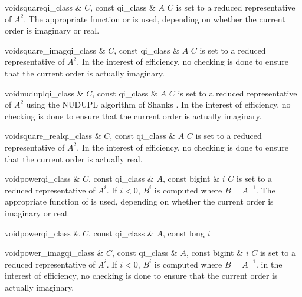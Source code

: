 \begin{fcode}{void}{square}{qi_class & $C$, const qi_class & $A$}
  $C$ is set to a reduced representative of $A^2$.  The appropriate function 
  or  is used, depending on whether the current order is imaginary or real.
\end{fcode}

\begin{fcode}{void}{square_imag}{qi_class & $C$, const qi_class & $A$}
  $C$ is set to a reduced representative of $A^2$.  In the interest of efficiency, no checking
  is done to ensure that the current order is actually imaginary.
\end{fcode}

\begin{fcode}{void}{nudupl}{qi_class & $C$, const qi_class & $A$}
  $C$ is set to a reduced representative of $A^2$ using the NUDUPL algorithm of Shanks
  \cite{Cohen:1995}.  In the interest of efficiency, no checking is done to ensure that the
  current order is actually imaginary.
\end{fcode}

\begin{fcode}{void}{square_real}{qi_class & $C$, const qi_class & $A$}
  $C$ is set to a reduced representative of $A^2$.  In the interest of efficiency, no checking
  is done to ensure that the current order is actually real.
\end{fcode}

\begin{fcode}{void}{power}{qi_class & $C$, const qi_class & $A$, const bigint & $i$}
  $C$ is set to a reduced representative of $A^i$.  If $i < 0$, $B^i$ is computed where $B =
  A^{-1}$.  The appropriate function  of  is used, depending
  on whether the current order is imaginary or real.
\end{fcode}

\begin{fcode}{void}{power}{qi_class & $C$, const qi_class & $A$, const long $i$}
\end{fcode}

\begin{fcode}{void}{power_imag}{qi_class & $C$, const qi_class & $A$, const bigint & $i$}
  $C$ is set to a reduced representative of $A^i$.  If $i < 0$, $B^i$ is computed where $B =
  A^{-1}$.  in the interest of efficiency, no checking is done to ensure that the current order
  is actually imaginary.
\end{fcode}

